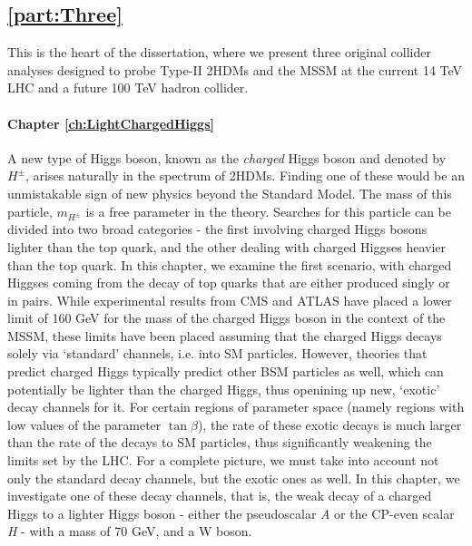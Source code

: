 \subsection{\autoref{part:Three}}
This is the heart of the dissertation, where we present three original collider analyses designed to probe Type-II 2HDMs and the MSSM at the current 14 TeV LHC and a future 100 TeV hadron collider.

\paragraph{Chapter \ref{ch:LightChargedHiggs}} 
A new type of Higgs boson, known as the \emph{charged} Higgs boson and denoted by $H^\pm$, arises naturally in the spectrum of 2HDMs. Finding one of these would be an unmistakable sign of new physics beyond the Standard Model. The mass of this particle, $m_{H^\pm}$ is a free parameter in the theory. Searches for this particle can be divided into two broad categories - the first involving charged Higgs bosons lighter than the top quark, and the other dealing with charged Higgses heavier than the top quark. In this chapter, we examine the first scenario, with charged Higgses coming from the decay of top quarks that are either produced singly or in pairs. While experimental results from CMS and ATLAS  have placed a lower limit of 160 GeV for the mass of the charged Higgs boson in the context of the MSSM, these limits have been placed assuming that the charged Higgs decays solely via `standard' channels, i.e. into SM particles. However, theories that predict charged Higgs typically predict other BSM particles as well, which can potentially be lighter than the charged Higgs, thus openining up new, `exotic' decay channels for it. For certain regions of parameter space (namely regions with low values of the parameter $\tan\beta$), the rate of these exotic decays is much larger than the rate of the decays to SM particles, thus significantly weakening the limits set by the LHC. For a complete picture, we must take into account not only the standard decay channels, but the exotic ones as well. In this chapter, we investigate one of these decay channels, that is, the weak decay of a charged Higgs to a lighter Higgs boson - either the pseudoscalar \emph{A} or the CP-even scalar \emph{H} - with a mass of 70 GeV, and a W boson. 
